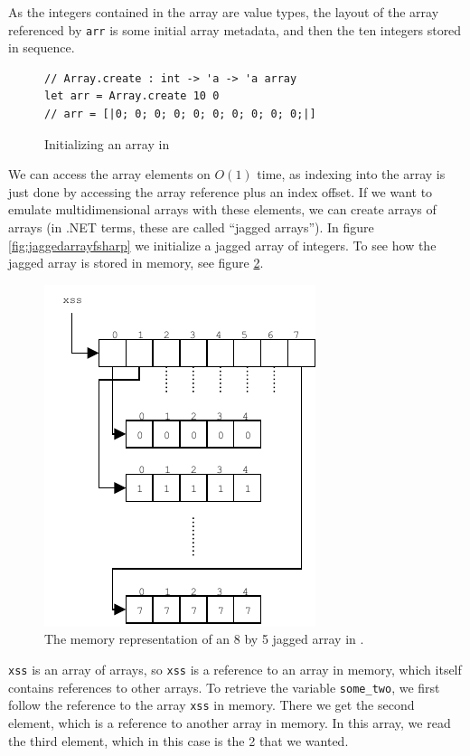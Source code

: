 As the integers contained in the array are value
types, the layout of the array referenced by \texttt{arr} is some initial array
metadata, and then the ten integers stored in sequence.
\begin{figure}[H]
  \centering
\begin{verbatim}
// Array.create : int -> 'a -> 'a array
let arr = Array.create 10 0
// arr = [|0; 0; 0; 0; 0; 0; 0; 0; 0; 0;|]
\end{verbatim}
  \caption{Initializing an array in \fsharp{}}
  \label{fig:initarray0}
\end{figure}
We can access the array elements on $O(1)$ time, as indexing into the array is
just done by accessing the array reference plus an index offset.
If we want to emulate multidimensional arrays with these elements, we can create
arrays of arrays (in .NET terms, these are called ``jagged arrays'').
In figure \ref{fig:jaggedarrayfsharp} we initialize a jagged array of integers.
To see how the jagged array is stored in memory, see figure \ref{fig:jaggedarraydrawing}.

\begin{figure}
  \centering
  \includegraphics[scale=2]{chapters/figs/jaggedarrays.pdf}
  \caption{The memory representation of an 8 by 5 jagged array in \csharp{}.}
  \label{fig:jaggedarraydrawing}
\end{figure}


\texttt{xss} is an array of arrays, so \texttt{xss} is a reference to an array
in memory, which itself contains references to other arrays.
To retrieve the variable \texttt{some\_two}, we first follow the reference to
the array \texttt{xss} in memory. There we get the second element, which is a
reference to another array in memory. In this array, we read the third element,
which in this case is the 2 that we wanted.

